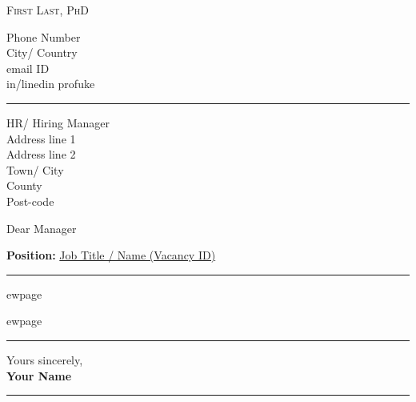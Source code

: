 \documentclass[11pt, a4paper, roman]{letter}
\begin{document}
\pagestyle{empty}
\raggedbottom

\begin{minipage}[t]{0.5\textwidth}
    \vspace*{\fill}
    \textsc{{\Huge First Last}, {\LARGE PhD}} %
    \vspace*{\fill}
\end{minipage}\hfill
\begin{minipage}[t]{0.3\textwidth}
    \setlength{\baselineskip}{15pt}
    \RaggedLeft 
    \faMobile{} Phone Number\\
    \faHome{} City/ Country\\ 
    \faEnvelope {} email ID\\ 
    \faLinkedinSquare{} in/linedin profuke
\end{minipage}

{\color{cvteal} \rule{\linewidth}{1mm}}

\begin{minipage}[t]{\textwidth}

    \begin{letter} {HR/ Hiring Manager\\Address line 1\\
Address line 2\\Town/ City\\County\\Post-code} %
\setlength{\parskip}{5pt} %
\setlength{\baselineskip}{15pt} %
    \opening{Dear Manager}

    \begin{center} {\textbf{Position:} \underline{Job Title / Name (Vacancy ID)}} \end{center}

\setlength{\parskip}{20pt}

\justifying{
\lipsum[1-4]
}   
\end{letter}
\end{minipage}

\vspace*{\fill}
{\color{cvteal} \rule{\linewidth}{1mm}}


ewpage


ewpage
{\color{cvteal} \rule{\linewidth}{1mm}}

{
\setlength{\parskip}{10pt}
\setlength{\parindent}{10pt}
\setlength{\baselineskip}{15pt}

\lipsum[1-7]
}

Yours sincerely,\\\textbf{Your Name}

\vspace*{\fill}

{\color{cvteal} \rule{\linewidth}{1mm}}
\end{document}
